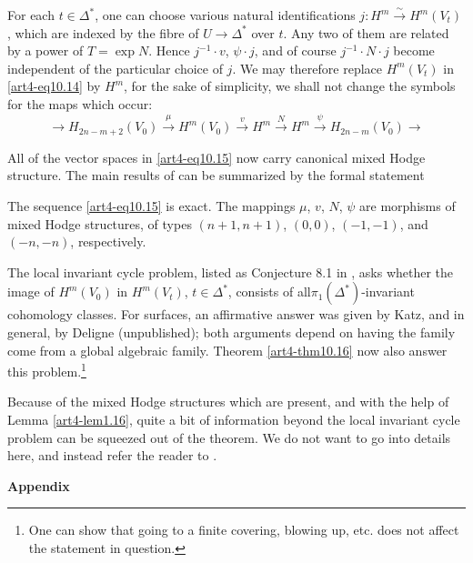 For each $t \in \Delta^\ast$, one can choose various natural identifications $j: H^m \xrightarrow{\sim} H^m (V_t)$, which are indexed by the fibre of $U \to \Delta^\ast$ over $t$. Any two of them are related by a power of $T = \exp N$. Hence $j^{-1} \cdot v$, $\psi \cdot j$, and of course $j^{-1} \cdot N \cdot j$ become independent of the particular choice of $j$. We may therefore replace $H^m (V_t)$ in \eqref{art4-eq10.14} by $H^m$, for the sake of simplicity, we shall not change the symbols for the maps which occur:
\begin{equation}
\longrightarrow H_{2n - m + 2} (V_0) \xrightarrow{\mu} H^m (V_0) \xrightarrow{v} H^m \xrightarrow{N} H^m \xrightarrow{\psi} H_{2n-m} (V_0) \longrightarrow
\label{art4-eq10.15}
\end{equation}

All of the vector spaces in \eqref{art4-eq10.15} now carry canonical mixed Hodge structure. The main results of \cite{art4-key10} can be summarized by the formal statement

\setcounter{theorem}{15}
\begin{theorem}\label{art4-thm10.16}
The sequence \eqref{art4-eq10.15} is exact. The mappings $\mu$, $v$, $N$, $\psi$ are morphisms of mixed Hodge structures, of types $(n+1, n+1)$, $(0,0)$, $(-1, -1)$, and $(-n, -n)$, respectively.
\end{theorem}

The local invariant cycle problem, listed as Conjecture 8.1 in \cite{art4-key21}, asks whether the image of $H^m (V_0)$ in $H^m (V_t)$, $t \in \Delta^\ast$, consists of all\pageoriginale $\pi_1 (\Delta^\ast)$-invariant cohomology classes. For surfaces, an affirmative answer was given by Katz, and in general, by Deligne (unpublished); both arguments depend on having the family come from a global algebraic family. Theorem \eqref{art4-thm10.16} now also answer this problem.\footnote[44]{One can show that going to a finite covering, blowing up, etc. does not affect the statement in question.}

Because of the mixed Hodge structures which are present, and with the help of Lemma \eqref{art4-lem1.16}, quite a bit of information beyond the local invariant cycle problem can be squeezed out of the theorem. We do not want to go into details here, and instead refer the reader to \cite{art4-key10}.

\bigskip
\begin{center}
\textbf{Appendix}
\end{center}

